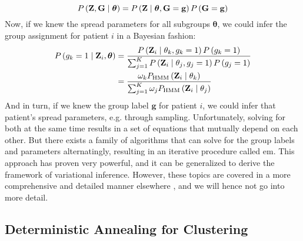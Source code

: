 \documentclass[\relativeRoot/main.tex]{subfiles}
\begin{document}
%
\begin{equation}
    P \left( \mathbf{Z}, \mathbf{G} \mid \boldsymbol{\theta} \right) = P \left( \mathbf{Z} \mid \boldsymbol{\theta}, \mathbf{G} = \mathbf{g} \right) P \left(\mathbf{G} = \mathbf{g}\right)
\end{equation}
%
Now, if we knew the spread parameters for all subgroups $\boldsymbol{\theta}$, we could infer the group assignment for patient $i$ in a Bayesian fashion:
%
\begin{equation}
    \begin{aligned}
        P \left( g_k = 1 \mid \mathbf{Z}_i, \boldsymbol{\theta} \right) &= \frac{P \left( \mathbf{Z}_i \mid \theta_k, g_k=1 \right) P \left( g_k = 1 \right)}{\sum_{j=1}^K{P \left( \mathbf{Z}_i \mid \theta_j, g_j=1 \right) P \left( g_j = 1 \right)}} \\
        &= \frac{\omega_k P_\text{HMM} \left( \mathbf{Z}_i \mid \theta_k \right)}{\sum_{j=1}^K{\omega_j P_\text{HMM} \left( \mathbf{Z}_i \mid \theta_j \right)}}
    \end{aligned}
\end{equation}
%
And in turn, if we knew the group label $\mathbf{g}$ for patient $i$, we could infer that patient's spread parameters, e.g. through sampling. Unfortunately, solving for both at the same time results in a set of equations that mutually depend on each other. But there exists a family of algorithms that can solve for the group labels and parameters alternatingly, resulting in an iterative procedure called \gls{em}. This approach has proven very powerful, and it can be generalized to derive the framework of variational inference. However, these topics are covered in a more comprehensive and detailed manner elsewhere \cite{bishop_pattern_2006,mackay_information_nodate,gelman_bayesian_2015}, and we will hence not go into more detail.

\subsection{Deterministic Annealing for Clustering}
\label{subsec:future:mixture:da}
\end{document}
